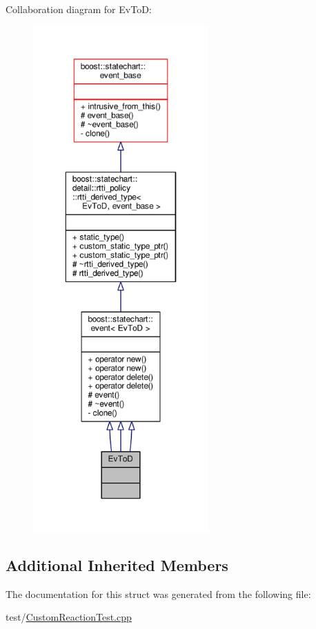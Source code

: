 Collaboration diagram for Ev\+ToD\+:
\nopagebreak
\begin{figure}[H]
\begin{center}
\leavevmode
\includegraphics[height=550pt]{struct_ev_to_d__coll__graph}
\end{center}
\end{figure}
\subsection*{Additional Inherited Members}


The documentation for this struct was generated from the following file\+:\begin{DoxyCompactItemize}
\item 
test/\mbox{\hyperlink{_custom_reaction_test_8cpp}{Custom\+Reaction\+Test.\+cpp}}\end{DoxyCompactItemize}
